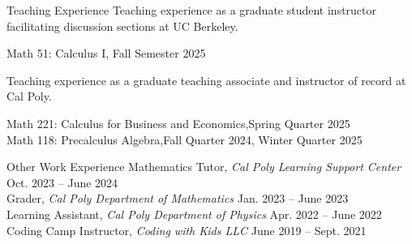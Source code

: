\documentclass[
	11pt, %
]{cv} %
\begin{document}
\begin{rSection}{Teaching Experience}
	Teaching experience as a graduate student instructor facilitating discussion sections at UC Berkeley.

	Math 51: Calculus I, \dotfill Fall Semester 2025 

	Teaching experience as a graduate teaching associate and instructor of record at Cal Poly.

	Math 221: Calculus for Business and Economics,\dotfill Spring Quarter 2025 \\
	Math 118: Precalculus Algebra,\dotfill Fall Quarter 2024, Winter Quarter 2025
\end{rSection}

\begin{rSection}{Other Work Experience}
	Mathematics Tutor, \textit{Cal Poly Learning Support Center} \dotfill Oct. 2023 -- June 2024 \\
	Grader, \textit{Cal Poly Department of Mathematics} \dotfill Jan. 2023 -- June 2023 \\
	Learning Assistant, \textit{Cal Poly Department of Physics} \dotfill Apr. 2022 -- June 2022 \\
	Coding Camp Instructor, \textit{Coding with Kids LLC} \dotfill June 2019 -- Sept. 2021
\end{rSection}
\end{document}
